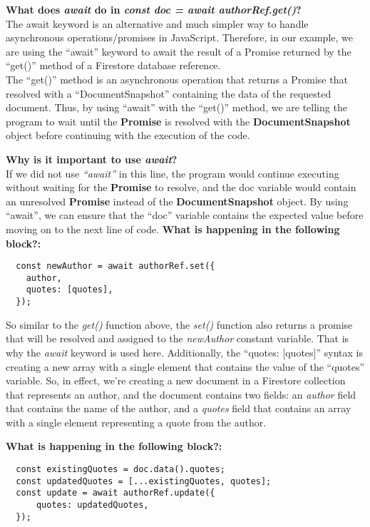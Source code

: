 \documentclass{article}
\begin{document}
\newpage
\textbf{What does \textit{await} do in \textit{const doc = await authorRef.get()}? }\\

The await keyword is an alternative and much simpler way to handle asynchronous operations/promises in JavaScript.
Therefore, in our example, we are using the ``await'' keyword to await the result of a Promise returned by the ``get()'' method of a Firestore database reference.\\ 

The ``get()'' method is an asynchronous operation that returns a Promise that resolved with a ``DocumentSnapshot'' containing the data of the requested document.
Thus, by using ``await'' with the ``get()'' method, we are telling the program to wait until the \textbf{Promise} is resolved with the \textbf{DocumentSnapshot} object before continuing with the execution of the code.

\newpage
\textbf{Why is it important to use \textit{await}?}\\

If we did not use \textit{``await''} in this line, the program would continue executing without waiting for the \textbf{Promise} to resolve, and the doc variable would contain an unresolved \textbf{Promise} instead of the \textbf{DocumentSnapshot} object. By using ``await'', we can ensure that the ``doc'' variable contains the expected value before moving on to the next line of code.
\newpage
\textbf{What is happening in the following block?:}\\
\begin{verbatim}
  const newAuthor = await authorRef.set({
    author,
    quotes: [quotes],
  });
\end{verbatim}
So similar to the \textit{get()} function above, the \textit{set()} function also returns a promise that will be resolved and assigned to the \textit{newAuthor} constant variable.
That is why the \textit{await} keyword is used here. Additionally, the ``quotes: [quotes]'' syntax is creating  a new array with a single element that contains the value of the ``quotes'' variable.
So, in effect, we're creating a new document in a Firestore collection that represents an author, and the document contains two fields: an \textit{author} field that contains the name of the author, and a \textit{quotes} field that contains an array with a single element representing a quote from the author.

\newpage
\textbf{What is happening in the following block?:}\\
\begin{verbatim}
  const existingQuotes = doc.data().quotes;
  const updatedQuotes = [...existingQuotes, quotes];
  const update = await authorRef.update({
      quotes: updatedQuotes,
  });
\end{verbatim}
\end{document}
